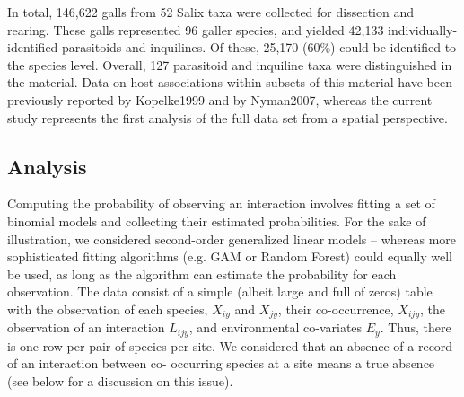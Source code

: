 \documentclass[12pt]{article}
\begin{document}
In total, 146,622 galls from 52 Salix taxa were collected for dissection and
rearing. These galls represented 96 galler species, and yielded 42,133
individually-identified parasitoids and inquilines. Of these, 25,170 (60\%)
could be identified to the species level. Overall, 127 parasitoid and
inquiline taxa were distinguished in the material. Data on host associations
within subsets of this material have been previously reported by Kopelke1999
and by Nyman2007, whereas the current study represents the first analysis of
the full data set from a spatial perspective.

\subsection*{Analysis}  

Computing the probability of observing an interaction involves fitting a set
of binomial models and collecting their estimated probabilities. For the sake
of illustration, we considered second-order generalized linear models –
whereas more sophisticated fitting algorithms (e.g. GAM or Random Forest)
could equally well be used, as long as the algorithm can estimate the
probability for each observation. The data consist of a simple (albeit large
and full of zeros) table with the observation of each species, $X_{iy}$ and $X_{jy}$,
their co-occurrence, $X_{ijy}$, the observation of an interaction $L_{ijy}$, and
environmental co-variates $E_y$. Thus, there is one row per pair of species per
site. We considered that an absence of a record of an interaction between co-
occurring species at a site means a true absence (see below for a discussion
on this issue).
\end{document}
